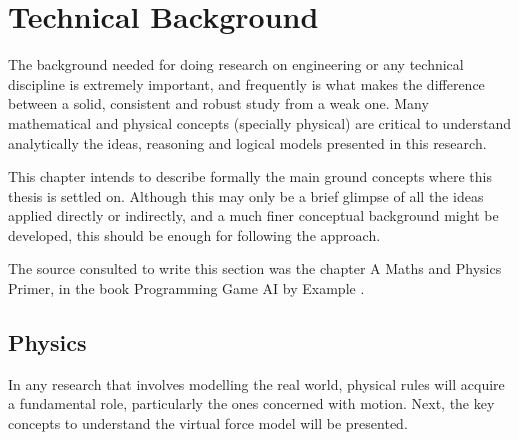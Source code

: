 \ifx\isEmbedded\undefined

\graphicspath{{../img/}}

\fi

\chapter{Technical Background}
\label{chap:technical_background}

The background needed for doing research on engineering or any technical discipline is extremely important, and frequently is what makes the difference between a solid, consistent and robust study from a weak one. Many mathematical and physical concepts (specially physical) are critical to understand analytically the ideas, reasoning and logical models presented in this research.

This chapter intends to describe formally the main ground concepts where this thesis is settled on. Although this may only be a brief glimpse of all the ideas applied directly or indirectly, and a much finer conceptual background might be developed, this should be enough for following the approach.

The source consulted to write this section was the chapter A Maths and Physics Primer, in the book Programming Game AI by Example \citep{buckland}.

\section{Physics}

In any research that involves modelling the real world, physical rules will acquire a fundamental role, particularly the ones concerned with motion. Next, the key concepts to understand the virtual force model will be presented.

